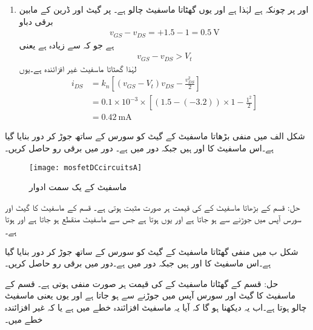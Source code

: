 \begin{enumerate}
\item
{} اور  	 پر چونکہ   ہے لہٰذا   ہے اور یوں گھٹاتا ماسفیٹ چالو ہے۔  پر گیٹ اور ڈرین کے مابین برقی دباو
\begin{align*}
v_{GS}-v_{DS}=+1.5-1=\SI{+0.5}{\volt}
\end{align*}
ہے جو کہ  سے زیادہ ہے یعنی
\begin{align*}
v_{GS}-v_{DS} > V_t
\end{align*}
لہٰذا گھٹاتا ماسفیٹ غیر افزائندہ ہے۔یوں
\begin{align*}
i_{DS}&=k_n \left[\left(v_{GS}-V_t \right )v_{DS}-\frac{v_{DS}^{2}}{2} \right ]\\
&=0.1 \times 10^{-3} \times \left[\left(1.5-(-3.2) \right ) \times  1 - \frac{1^2}{2} \right ]\\
&=\SI{0.42}{\milli \ampere}
\end{align*}

\end{enumerate}



شکل  الف میں منفی بڑھاتا ماسفیٹ کے گیٹ کو سورس کے ساتھ جوڑ کر دور بنایا گیا ہے۔اس ماسفیٹ کا    اور  ہیں جبکہ دور میں  ہے۔ دور میں برقی رو حاصل کریں۔
\begin{figure}
\centering
\texttt{[image: mosfetDCcircuitsA]}
\caption{ماسفیٹ کے یک سمت ادوار}
\label{شکل_ماسفیٹ_کے_یک_سمتی_ادوار_الف}
\end{figure}

حل:  قسم کے بڑھاتا ماسفیٹ کے   کی قیمت ہر صورت مثبت ہوتی ہے۔  قسم کے ماسفیٹ کا گیٹ اور سورس آپس میں جوڑنے سے  ہو جاتا ہے اور یوں    ہوتا ہے جس سے ماسفیٹ منقطع ہو جاتا ہے اور    ہوتا ہے۔

شکل  ب میں منفی گھٹاتا ماسفیٹ کے گیٹ کو سورس کے ساتھ جوڑ کر دور بنایا گیا ہے۔اس ماسفیٹ کا  اور  ہیں  جبکہ دور میں   ہے۔دور میں برقی رو حاصل کریں۔

حل:  قسم کے گھٹاتا ماسفیٹ کے   کی قیمت ہر صورت منفی ہوتی ہے۔  قسم کے ماسفیٹ کا گیٹ اور سورس آپس میں جوڑنے سے    ہو جاتا ہے اور یوں   یعنی ماسفیٹ چالو ہوتا ہے۔اب یہ دیکھنا ہو گا کہ آیا یہ ماسفیٹ افزائندہ خطے میں ہے یا کہ غیر افزائندہ خطے میں۔

